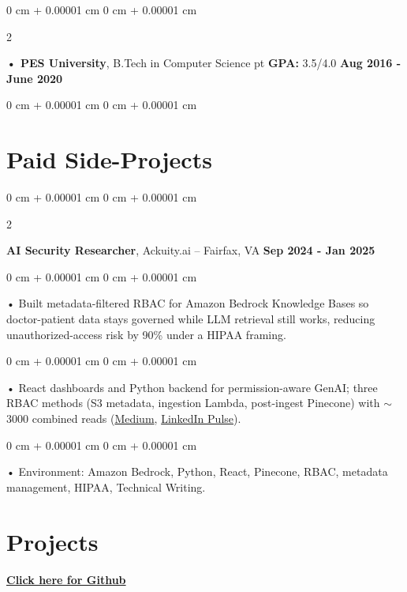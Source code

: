 \documentclass[10pt, letterpaper]{article}
\newenvironment{onecolentry}{
    \begin{adjustwidth}{
        0 cm + 0.00001 cm
    }{
        0 cm + 0.00001 cm
    }
}{
    \end{adjustwidth}
} %
\newenvironment{twocolentry}[2][]{
    \onecolentry
    \def\secondColumn{#2}
    \setcolumnwidth{\fill, 4.5 cm}
    \begin{paracol}{2}
}{
    \switchcolumn \raggedleft \secondColumn
    \end{paracol}
    \endonecolentry
} %
\begin{document}
        \begin{twocolentry}{
            \textbf{Aug 2016 - June 2020}
        }
            \textbf{ • PES University}, B.Tech in Computer Science  pt \textbf{GPA:} 3.5/4.0  \end{twocolentry}
        \begin{onecolentry}

                        \vspace{0.15cm}
    \section{Paid Side-Projects}
            \vspace{2 pt }
                    \begin{twocolentry}{
            \textbf{Sep 2024 - Jan 2025}
        }
            \textbf{AI Security Researcher}, Ackuity.ai -- Fairfax, VA\end{twocolentry}

        \begin{onecolentry}
             • Built metadata-filtered RBAC for Amazon Bedrock Knowledge Bases so doctor-patient data stays governed while LLM retrieval still works, reducing unauthorized-access risk by 90\% under a HIPAA framing.
        \end{onecolentry}
        \begin{onecolentry}
             • React dashboards and Python backend for permission-aware GenAI; three RBAC methods (S3 metadata, ingestion Lambda, post-ingest Pinecone) with $\sim$3000 combined reads (\href{https://medium.com/@sreenikethaathreya/building-a-permission-aware-genai-application-on-amazon-bedrock-8fdc2410dd43}{Medium}, \href{https://www.linkedin.com/pulse/building-permission-aware-genai-application-amazon-bedrock-aathreya-g7nme/}{LinkedIn Pulse}).
        \end{onecolentry}
        \begin{onecolentry}
             • Environment: Amazon Bedrock, Python, React, Pinecone, RBAC, metadata management, HIPAA, Technical Writing.

        \end{onecolentry}
\enlargethispage{7\baselineskip}
\section{Projects}
    \vspace{2 pt}
\end{onecolentry}
\textbf{\href{https://github.com/daedalus-s}{Click here for Github}}
\end{document}
